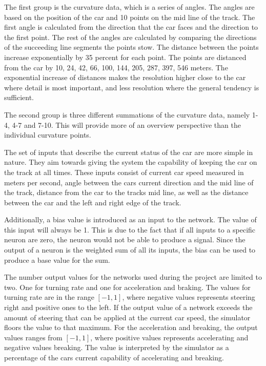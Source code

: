 The first group is the curvature data, which is a series of angles. The angles are based on the position of the car and 10 points on the mid line of the track. The first angle is calculated from the direction that the car faces and the direction to the first point. The rest of the angles are calculated by comparing the directions of the succeeding line segments the points stow. The distance between the points increase exponentially by 35 percent for each point. The points are distanced from the car by 10, 24, 42, 66, 100, 144, 205, 287, 397, 546 meters. The exponential increase of distances makes the resolution higher close to the car where detail is most important, and less resolution where the general tendency is sufficient.

The second group is three different summations of the curvature data, namely 1-4, 4-7 and 7-10. This will provide more of an overview perspective than the individual curvature points.

The set of inputs that describe the current status of the car are more simple in nature. They aim towards giving the system the capability of keeping the car on the track at all times. These inputs consist of current car speed measured in meters per second, angle between the cars current direction and the mid line of the track, distance from the car to the tracks mid line, as well as the distance between the car and the left and right edge of the track.

Additionally, a bias value is introduced as an input to the network. The value of this input will always be 1. This is due to the fact that if all inputs to a specific neuron are zero, the neuron would not be able to produce a signal. Since the output of a neuron is the weighted sum of all its inputs, the bias can be used to produce a base value for the sum. 

The number output values for the networks used during the project are limited to two. One for turning rate and one for acceleration and braking. The values for turning rate are in the range $[-1,1]$, where negative values represents steering right and positive ones to the left. If the output value of a network exceeds the amount of steering that can be applied at the current car speed, the simulator floors the value to that maximum. For the acceleration and breaking, the output values ranges from $[-1, 1]$, where positive values represents accelerating and negative values breaking. The value is interpreted by the simulator as a percentage of the cars current capability of accelerating and breaking.

